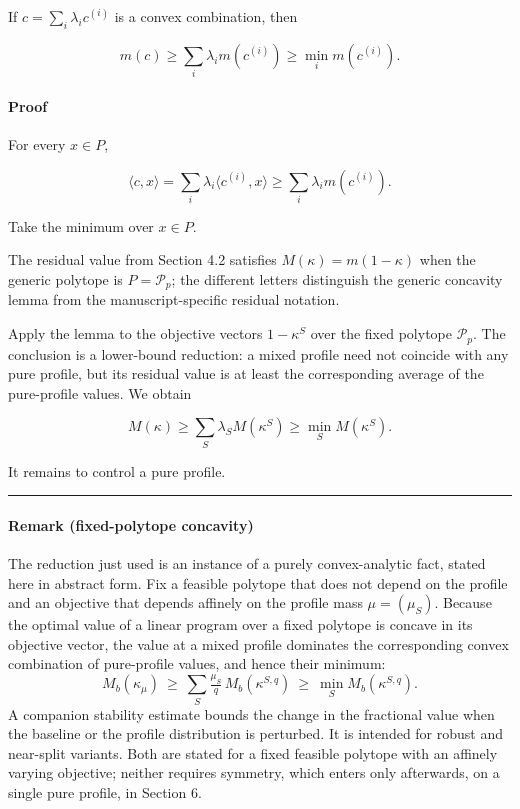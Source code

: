 \documentclass[english,11pt,a4paper]{article}
\begin{document}
If \(c=\sum_i\lambda_ic^{(i)}\) is a convex combination, then

\[
m(c)
\ge
\sum_i\lambda_i m(c^{(i)})
\ge
\min_i m(c^{(i)}).
\]

\paragraph{Proof}\label{proof-1}

For every \(x\in P\),

\[
\langle c,x\rangle
=
\sum_i\lambda_i\langle c^{(i)},x\rangle
\ge
\sum_i\lambda_i m(c^{(i)}).
\]

Take the minimum over \(x\in P\).

The residual value from Section 4.2 satisfies \(M(\kappa)=m(1-\kappa)\)
when the generic polytope is \(P=\mathcal P_p\); the different letters
distinguish the generic concavity lemma from the manuscript-specific
residual notation.

Apply the lemma to the objective vectors \(1-\kappa^S\) over the fixed
polytope \(\mathcal P_p\). The conclusion is a lower-bound reduction: a
mixed profile need not coincide with any pure profile, but its residual
value is at least the corresponding average of the pure-profile values.
We obtain

\[
\boxed{
M(\kappa)
\ge
\sum_S\lambda_SM(\kappa^S)
\ge
\min_SM(\kappa^S)
}.
\tag{5.4}
\]

It remains to control a pure profile.

\begin{center}\rule{0.5\linewidth}{0.5pt}\end{center}

\paragraph{Remark (fixed-polytope
concavity)}\label{remark-fixed-polytope-concavity}

The reduction just used is an instance of a purely convex-analytic fact,
stated here in abstract form. Fix a feasible polytope that does not
depend on the profile and an objective that depends affinely on the
profile mass \(\mu=(\mu_S)\). Because the optimal value of a linear
program over a fixed polytope is concave in its objective vector, the
value at a mixed profile dominates the corresponding convex combination
of pure-profile values, and hence their minimum: \[
M_b(\kappa_\mu)\ \ge\ \sum_S \tfrac{\mu_S}{q}\,M_b(\kappa^{S,q})\ \ge\ \min_S M_b(\kappa^{S,q}).
\] A companion stability estimate bounds the change in the fractional
value when the baseline or the profile distribution is perturbed. It is
intended for robust and near-split variants. Both are stated for a fixed
feasible polytope with an affinely varying objective; neither requires
symmetry, which enters only afterwards, on a single pure profile, in
Section 6.
\end{document}
